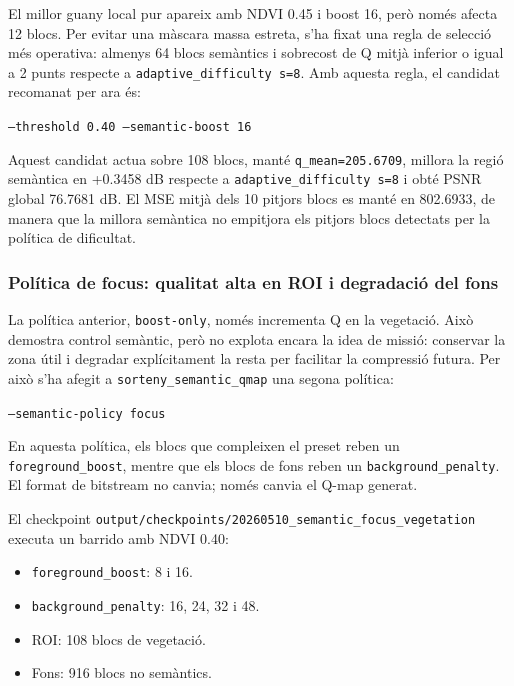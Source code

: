 \documentclass[11pt,a4paper]{article}
\begin{document}
El millor guany local pur apareix amb NDVI 0.45 i boost 16, però només afecta 12 blocs. Per evitar una màscara massa estreta, s'ha fixat una regla de selecció més operativa: almenys 64 blocs semàntics i sobrecost de Q mitjà inferior o igual a 2 punts respecte a \texttt{adaptive\_difficulty s=8}. Amb aquesta regla, el candidat recomanat per ara és:

\begin{center}
\texttt{--threshold 0.40 --semantic-boost 16}
\end{center}

Aquest candidat actua sobre 108 blocs, manté \texttt{q\_mean=205.6709}, millora la regió semàntica en +0.3458 dB respecte a \texttt{adaptive\_difficulty s=8} i obté PSNR global 76.7681 dB. El MSE mitjà dels 10 pitjors blocs es manté en 802.6933, de manera que la millora semàntica no empitjora els pitjors blocs detectats per la política de dificultat.

\subsubsection{Política de focus: qualitat alta en ROI i degradació del fons}

La política anterior, \texttt{boost-only}, només incrementa Q en la vegetació. Això demostra control semàntic, però no explota encara la idea de missió: conservar la zona útil i degradar explícitament la resta per facilitar la compressió futura. Per això s'ha afegit a \texttt{sorteny\_semantic\_qmap} una segona política:

\begin{center}
\texttt{--semantic-policy focus}
\end{center}

En aquesta política, els blocs que compleixen el preset reben un \texttt{foreground\_boost}, mentre que els blocs de fons reben un \texttt{background\_penalty}. El format de bitstream no canvia; només canvia el Q-map generat.

El checkpoint \texttt{output/checkpoints/20260510\_semantic\_focus\_vegetation} executa un barrido amb NDVI 0.40:

\begin{itemize}
  \item \texttt{foreground\_boost}: 8 i 16.
  \item \texttt{background\_penalty}: 16, 24, 32 i 48.
  \item ROI: 108 blocs de vegetació.
  \item Fons: 916 blocs no semàntics.
\end{itemize}
\end{document}
